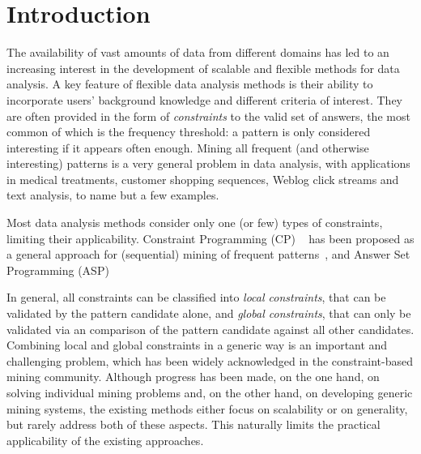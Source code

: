 

\section{Introduction}\label{sec:intro}
The availability of vast amounts of data from different domains has led to an increasing interest in the development of scalable and flexible methods for data analysis.
A key feature of flexible data analysis methods is their ability to incorporate users' background knowledge and different criteria of interest. They are often provided in the form of \emph{constraints} to the valid set of answers, the most common of which is the frequency threshold: a pattern is only considered interesting if it appears often enough. Mining all frequent (and otherwise interesting) patterns is a very general problem in data analysis, with applications in medical treatments, customer shopping sequences, Weblog click streams and text analysis, to name but a few examples.

Most data analysis methods consider only one (or few) types of constraints, limiting their applicability. Constraint Programming (CP) ~\parencite{DBLP:conf/cpaior/NegrevergneG15,DBLP:journals/ai/GunsDNTR17} has been proposed as a general approach for (sequential) mining of frequent patterns~\parencite{DBLP:books/mit/fayyadPSU96/AgrawalMSTV96}, and Answer Set Programming (ASP) 


In general, all constraints can be classified into \emph{local constraints}, that can be validated by the pattern candidate alone, and \emph{global constraints}, that can only be validated via an comparison of the pattern candidate against all other candidates. Combining local and global constraints in a generic way is an important and challenging problem, which has been widely acknowledged in the constraint-based mining community.  Although progress has been made, on the one hand, on solving individual mining problems and, on the other hand, on developing generic mining systems, the existing methods either focus on scalability or on generality, but rarely address both of these aspects. This naturally limits the practical applicability of the existing approaches.

